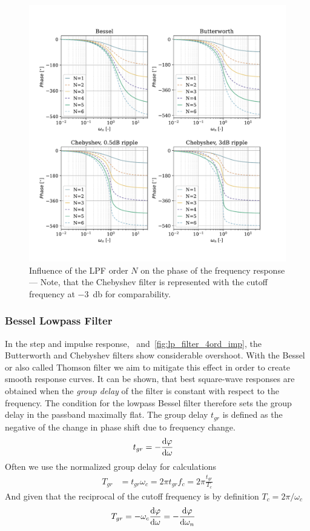 {%
\begin{figure}[!htb]
  \centering
  \includegraphics[scale=0.68]{figures/electronics/lowpass/lp_filter_pha}
  \caption[Influence of the \ac{LPF} order $N$ on the  phase of the frequency response]{Influence of the \ac{LPF} order $N$ on the  phase of the frequency response --- Note, that the Chebyshev filter is represented with the cutoff frequency at \SI{-3}{\decibel} for comparability.%
    \label{fig:lp_filter_pha}}
\end{figure}
\clearpage
}

\subsubsection{Bessel Lowpass Filter}
In the step and impulse response, ~and~\ref{fig:lp_filter_4ord_imp}, the Butterworth and Chebyshev filters show considerable overshoot. With the Bessel or also called Thomson filter we aim to mitigate this effect in order to create smooth response curves. It can be shown, that best square-wave responses are obtained when the \emph{group delay} of the filter is constant with respect to the frequency. The condition for the lowpass Bessel filter therefore sets the group delay in the passband maximally flat. The group delay $t_{gr}$ is defined as the negative of the change in phase shift due to frequency change.
\begin{align}
  t_{gr} &= -\dv{\varphi}{\omega}
\end{align}
Often we use the normalized group delay for calculations
\begin{align}
  T_{gr} &= t_{gr}\omega_c = 2\pi t_{gr}f_c = 2\pi\frac{t_{gr}}{T_c}
\end{align}
And given that the reciprocal of the cutoff frequency is by definition $T_c=2\pi/\omega_c$
\begin{align}
  T_{gr} &= -\omega_c\dv{\varphi}{\omega} = -\dv{\varphi}{\omega_n}
\end{align}

